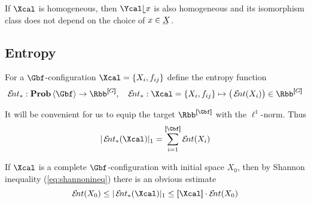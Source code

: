   If $\Xcal$ is homogeneous, then $\Ycal\rel x$ is also homogeneous and
  its isomorphism class does not depend on the choice of $x\in\un X$.

\subsection{Entropy}
\label{s:config-entropy}
  For a $\Gbf$-configuration $\Xcal=\set{X_{i},f_{ij}}$ define the
  entropy function
  \[
    \ent_{*}:\prob\<\Gbf>\to\Rbb^{\size{G}},
    \quad
    \ent_{*}:\Xcal=\set{X_{i},f_{ij}}\mapsto 
    \big(\ent(X_{i})\big)\in\Rbb^{\size{G}}
  \]

  It will be convenient for us to equip the target
  $\Rbb^{\size{\Gbf}}$ with the $\ell^{1}$-norm. Thus
  \[
    |\Ent_{*}(\Xcal)|_{1}=\sum_{i=1}^{\size{\Gbf}}\ent(X_{i})
  \]

  If $\Xcal$ is a complete $\Gbf$-configuration with initial space
  $X_{0}$, then by Shannon inequality (\ref{eq:shannonineq}) there is an
  obvious estimate
  \[
    \ent(X_{0})
    \leq
    |\Ent_{*}(\Xcal)|_{1}
    \leq
    \size{\Xcal}\cdot\ent(X_{0})
  \]

